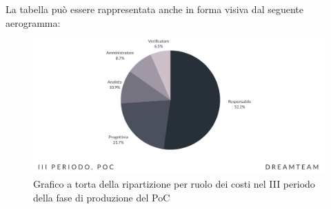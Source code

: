 La tabella può essere rappresentata anche in forma visiva dal seguente aerogramma:
\begin{figure}[H]
\centering
\includegraphics[scale=0.65]{Sezioni/SezioniPreventivo/grafici/Poc_III_periodo_costi.png}
\caption{Grafico a torta della ripartizione per ruolo dei costi nel III periodo della fase di produzione del PoC}
\end{figure}



